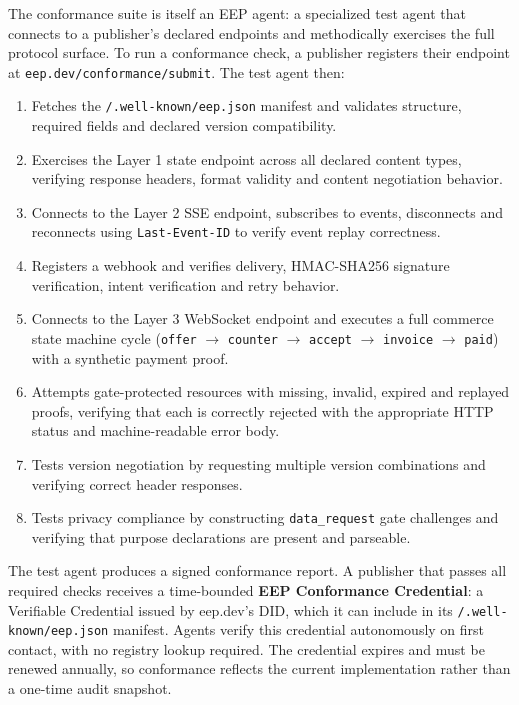 \documentclass[12pt,a4paper]{article}
\begin{document}
The conformance suite is itself an EEP agent: a specialized test agent that connects to a publisher's declared endpoints and methodically exercises the full protocol surface. To run a conformance check, a publisher registers their endpoint at \texttt{eep.dev/conformance/submit}. The test agent then:

\begin{enumerate}
    \item Fetches the \texttt{/.well-known/eep.json} manifest and validates structure, required fields and declared version compatibility.
    \item Exercises the Layer 1 state endpoint across all declared content types, verifying response headers, format validity and content negotiation behavior.
    \item Connects to the Layer 2 SSE endpoint, subscribes to events, disconnects and reconnects using \texttt{Last-Event-ID} to verify event replay correctness.
    \item Registers a webhook and verifies delivery, HMAC-SHA256 signature verification, intent verification and retry behavior.
    \item Connects to the Layer 3 WebSocket endpoint and executes a full commerce state machine cycle (\texttt{offer} $\to$ \texttt{counter} $\to$ \texttt{accept} $\to$ \texttt{invoice} $\to$ \texttt{paid}) with a synthetic payment proof.
    \item Attempts gate-protected resources with missing, invalid, expired and replayed proofs, verifying that each is correctly rejected with the appropriate HTTP status and machine-readable error body.
    \item Tests version negotiation by requesting multiple version combinations and verifying correct header responses.
    \item Tests privacy compliance by constructing \texttt{data\_request} gate challenges and verifying that purpose declarations are present and parseable.
\end{enumerate}

The test agent produces a signed conformance report. A publisher that passes all required checks receives a time-bounded \textbf{EEP Conformance Credential}: a Verifiable Credential issued by eep.dev's DID, which it can include in its \texttt{/.well-known/eep.json} manifest. Agents verify this credential autonomously on first contact, with no registry lookup required. The credential expires and must be renewed annually, so conformance reflects the current implementation rather than a one-time audit snapshot.
\end{document}
